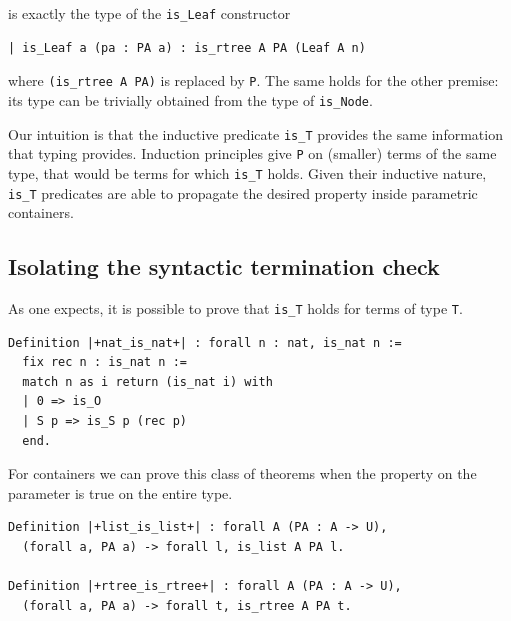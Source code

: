 \documentclass[sigplan,10pt,review]{acmart}\settopmatter{printfolios=true,printccs=false,printacmref=false}
\begin{document}
\noindent
is exactly the type of the \lstinline+is_Leaf+ constructor

\begin{minipage}{\textwidth}\begin{lstlisting}
| is_Leaf a (pa : PA a) : is_rtree A PA (Leaf A n)
\end{lstlisting}\end{minipage}

\noindent
where \lstinline+(is_rtree A PA)+ is replaced by \lstinline+P+.
The same holds for the other premise: its type can be trivially
obtained from the type of \lstinline+is_Node+.

Our intuition is that the inductive predicate \lstinline+is_T+
provides the same information that typing provides. Induction
principles give \lstinline+P+ on (smaller) terms of the same type,
that would be terms for which \lstinline+is_T+ holds.
Given their inductive nature, \lstinline+is_T+ predicates
are able to propagate the desired property inside parametric
containers.

\subsection{Isolating the syntactic termination check} %
\label{sec:idea:transparent}

As one expects, it is possible to prove that \lstinline+is_T+
holds for terms of type \lstinline+T+.

\begin{minipage}{\textwidth}\begin{lstlisting}
Definition |+nat_is_nat+| : forall n : nat, is_nat n :=
  fix rec n : is_nat n :=
  match n as i return (is_nat i) with
  | 0 => is_O
  | S p => is_S p (rec p)
  end.
\end{lstlisting}\end{minipage}

\noindent
For containers we can prove this class of theorems
when the property on the
parameter is true on the entire type.

\begin{minipage}{\textwidth}\begin{lstlisting}
Definition |+list_is_list+| : forall A (PA : A -> U),
  (forall a, PA a) -> forall l, is_list A PA l.

Definition |+rtree_is_rtree+| : forall A (PA : A -> U),
  (forall a, PA a) -> forall t, is_rtree A PA t.
\end{lstlisting}\end{minipage}
\end{document}
